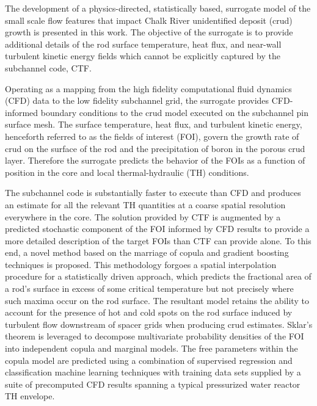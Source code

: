 
\utabstract
{}%
\indent
The development of a physics-directed, statistically based,
surrogate model of the small scale flow features that impact Chalk River unidentified deposit (crud) growth is presented in this work. 
The objective of the surrogate is to provide additional details of the rod surface temperature, heat
flux, and near-wall turbulent kinetic energy fields which cannot be explicitly captured by the subchannel code, CTF. 

Operating as a mapping from the high fidelity computational fluid dynamics (CFD) data to the low fidelity subchannel grid, the surrogate provides CFD-informed boundary conditions to the crud model executed on the subchannel pin surface mesh. The surface temperature, heat
flux, and turbulent kinetic energy, henceforth referred to as the fields of interest (FOI),
govern the growth rate of crud on the surface of the rod and the
precipitation of boron in the porous crud layer. Therefore the surrogate predicts the behavior of the
FOIs as a function of position in the core and local thermal-hydraulic (TH) conditions.

The subchannel code is substantially faster to execute than CFD
and produces an estimate for all the relevant TH quantities at a coarse spatial resolution everywhere in
the core.  The solution provided by CTF is augmented by a predicted stochastic
component of the FOI informed by CFD results to provide a more detailed description of the target
FOIs than CTF can provide alone.  To this end, a novel method based on the marriage of copula and
gradient boosting techniques is proposed. This methodology forgoes a spatial interpolation procedure
for a statistically driven approach, which predicts the fractional area of a rod’s surface in excess of some
critical temperature but not precisely where such maxima occur on the rod surface.
The resultant model retains the ability to account for the presence
of hot and cold spots on the rod surface induced by turbulent flow downstream of spacer grids when
producing crud estimates. Sklar’s theorem is leveraged to decompose multivariate probability densities
of the FOI into independent copula and marginal models. The free parameters within the copula model
are predicted using a combination of supervised regression and classification machine learning techniques
with training data sets supplied by a suite of precomputed CFD results spanning a typical pressurized water reactor TH
envelope.
